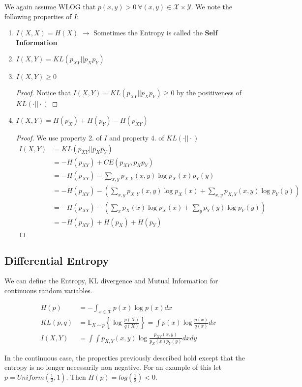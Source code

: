 \documentclass[]{article}
\theoremstyle{mattstyle}
\theoremstyle{definition}
\begin{document}
We again assume WLOG that \(p(x,y)>0 \ \forall (x,y)\in\mathcal{X}\times\mathcal{Y}\). We note the following properties of $I$:

\begin{enumerate}
	\item \(I(X,X) = H(X)\) \(\rightarrow\) Sometimes the Entropy is called the \textbf{Self Information}
	\item $I(X,Y) = KL(p_{XY}||p_Xp_Y)$
	\item \(I(X,Y)\ge 0\)
	\begin{proof}
		Notice that \(I(X,Y) = KL(p_{XY}||p_Xp_Y) \ge 0\) by the positiveness of \(KL(\cdot||\cdot)\)
	\end{proof}
	\item $I(X,Y) = H(p_X) + H(p_Y) -H(p_{XY})$
	\begin{proof} We use property 2. of $I$ and property 4. of \(KL(\cdot||\cdot)\)
		\begin{align*}
		I(X,Y) &= KL(p_{XY}||p_Xp_Y) \\
		&= -H(p_{XY}) + CE(p_{XY},p_Xp_Y) \\
		&= -H(p_{XY}) - \sum_{x,y}p_{X,Y}(x,y)\log p_X(x)p_Y(y)\\
		&= -H(p_{XY}) - \left(\sum_{x,y}p_{X,Y}(x,y)\log p_X(x) + \sum_{x,y}p_{X,Y}(x,y)\log p_Y(y)\right)\\
		&=-H(p_{XY}) - \left(\sum_{x}p_{X}(x)\log p_X(x) + \sum_{y}p_{Y}(y)\log p_Y(y)\right)\\
		&= -H(p_{XY}) + H(p_X) + H(p_Y)
		\end{align*}
	\end{proof}
	
\end{enumerate}

\subsection{Differential Entropy}
We can define the Entropy, KL divergence and Mutual Information for continuous random variables.

\begin{align}
H(p) &= -\int_{x\in\mathcal{X}}p(x)\log p(x)dx \\
KL(p,q) &= \mathbb{E}_{X\sim p}\left\{\log \frac{p(X)}{q(X)}\right\} = \int p(x)\log\frac{p(x)}{q(x)}dx\\
I(X,Y) &=\int\int p_{X,Y}(x,y)\log\frac{p_{XY}(x,y)}{p_X(x)p_Y(y)}dxdy
\end{align}

In the continuous case, the properties previously described hold except that the entropy is no longer necessarily non negative. For an example of this let $p = Uniform\left(\frac{1}{2},1\right)$. Then $H(p) = log(\frac{1}{2}) < 0$.
\end{document}

